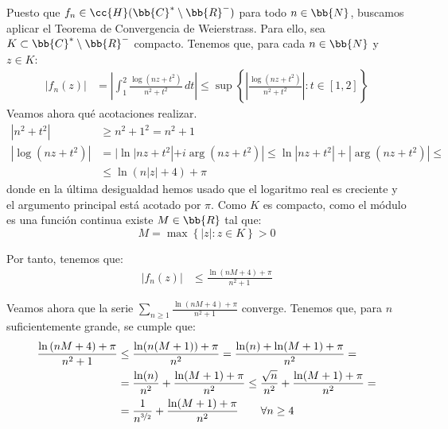 \documentclass[12pt]{article}
\begin{document}
\begin{ejercicio}[2.5 puntos]
\begin{enumerate}
            Puesto que $f_n\in \cc{H}(\bb{C}^* \setminus \bb{R}^-)$ para todo $n\in \bb{N}$, buscamos aplicar el Teorema de Convergencia de Weierstrass. Para ello, sea $K\subset \bb{C}^* \setminus \bb{R}^-$ compacto. Tenemos que, para cada $n\in \bb{N}$ y $z\in K$:
            \begin{align*}
                \left|f_n(z)\right| &= \left|\int_1^2 \frac{\log(nz + t^2)}{n^2 + t^2} \, dt\right| \leq \sup\left\{ \left|\frac{\log(nz + t^2)}{n^2 + t^2}\right| : t\in [1,2] \right\}
            \end{align*}
            Veamos ahora qué acotaciones realizar. 
            \begin{align*}
                |n^2 + t^2| &\geq n^2 + 1^2 = n^2 + 1 \\
                |\log(nz + t^2)| &= |\ln|nz + t^2| + i\arg(nz + t^2)| \leq \ln|nz + t^2| + |\arg(nz + t^2)|\leq\\&\leq  \ln\left(n|z| + 4\right) + \pi
            \end{align*}
            donde en la última desigualdad hemos usado que el logaritmo real es creciente y el argumento principal está acotado por $\pi$. Como $K$ es compacto, como el módulo es una función continua existe $M\in \bb{R}$ tal que:
            \begin{equation*}
                M=\max\left\{ |z| : z\in K \right\}>0
            \end{equation*}

            Por tanto, tenemos que:
            \begin{align*}
                \left|f_n(z)\right| &\leq \frac{\ln\left(nM + 4\right) + \pi}{n^2 + 1}
            \end{align*}

            Veamos ahora que la serie $\sum\limits_{n\geq 1} \frac{\ln\left(nM + 4\right) + \pi}{n^2 + 1}$ converge. Tenemos que, para $n$ suficientemente grande, se cumple que:
            \begin{align*}
                \frac{\ln\left(nM + 4\right) + \pi}{n^2 + 1} &\leq \frac{\ln(n(M+1)) + \pi}{n^2} = \frac{\ln(n) + \ln(M+1) + \pi}{n^2}
                =\\&= 
                \frac{\ln(n)}{n^2} + \frac{\ln(M+1) + \pi}{n^2}
                \leq \frac{\sqrt{n}}{n^2} + \frac{\ln(M+1) + \pi}{n^2}
                =\\&= \frac{1}{n^{\nicefrac{3}{2}}} + \frac{\ln(M+1) + \pi}{n^2}
                \qquad \forall n\geq 4
            \end{align*}
            

\end{enumerate}
\end{ejercicio}
\end{document}
